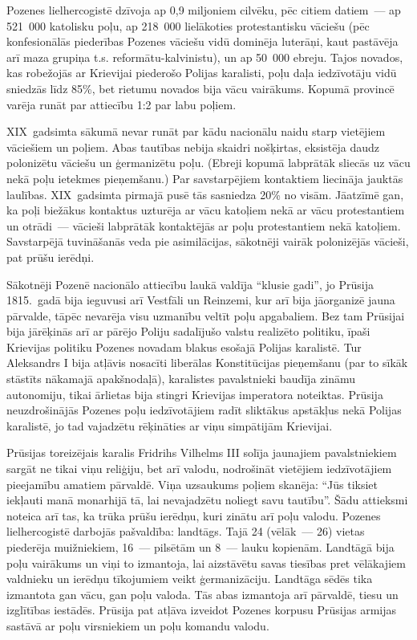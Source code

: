 \documentclass[twoside,a5paper,12pt,fleqn,openany]{extbook}
\begin{document}
Pozenes lielhercogistē dzīvoja ap 0,9 miljoniem cilvēku, pēc citiem datiem~--- ap 521~000 katolisku poļu, ap 218~000 lielākoties protestantisku vāciešu (pēc konfesionālās piederības Pozenes vāciešu vidū dominēja luterāņi, kaut pastāvēja arī maza grupiņa t.s. reformātu-kalvinistu), un ap 50~000 ebreju. Tajos novados, kas robežojās ar Krievijai piederošo Polijas karalisti, poļu daļa iedzīvotāju vidū sniedzās līdz 85\%, bet rietumu novados bija vācu vairākums. Kopumā provincē varēja runāt par attiecību 1:2 par labu poļiem.

XIX~gadsimta sākumā nevar runāt par kādu nacionālu naidu starp vietējiem vāciešiem un poļiem. Abas tautības nebija skaidri nošķirtas, eksistēja daudz polonizētu vāciešu un ģermanizētu poļu. (Ebreji kopumā labprātāk sliecās uz vācu nekā poļu ietekmes pieņemšanu.) Par savstarpējiem kontaktiem liecināja jauktās laulības. XIX~gadsimta pirmajā pusē tās sasniedza 20\% no visām. Jāatzīmē gan, ka poļi biežākus kontaktus uzturēja ar vācu katoļiem nekā ar vācu protestantiem un otrādi~--- vācieši labprātāk kontaktējās ar poļu protestantiem nekā katoļiem. Savstarpējā tuvināšanās veda pie asimilācijas, sākotnēji vairāk polonizējās vācieši, pat prūšu ierēdņi.

Sākotnēji Pozenē nacionālo attiecību laukā valdīja ``klusie gadi'', jo Prūsija 1815.~gadā bija ieguvusi arī Vestfāli un Reinzemi, kur arī bija jāorganizē jauna pārvalde, tāpēc nevarēja visu uzmanību veltīt poļu apgabaliem. Bez tam Prūsijai bija jārēķinās arī ar pārējo Poliju sadalījušo valstu realizēto politiku, īpaši Krievijas politiku Pozenes novadam blakus esošajā Polijas karalistē. Tur Aleksandrs I bija atļāvis nosacīti liberālas Konstitūcijas pieņemšanu (par to sīkāk stāstīts nākamajā apakšnodaļā), karalistes pavalstnieki baudīja zināmu autonomiju, tikai ārlietas bija stingri Krievijas imperatora noteiktas. Prūsija neuzdrošinājās Pozenes poļu iedzīvotājiem radīt sliktākus apstākļus nekā Polijas karalistē, jo tad vajadzētu rēķināties ar viņu simpātijām Krievijai.

Prūsijas toreizējais karalis Fridrihs Vilhelms III solīja jaunajiem pavalstniekiem sargāt ne tikai viņu reliģiju, bet arī valodu, nodrošināt vietējiem iedzīvotājiem pieejamību amatiem pārvaldē. Viņa uzsaukums poļiem skanēja: ``Jūs tiksiet iekļauti manā monarhijā tā, lai nevajadzētu noliegt savu tautību''. Šādu attieksmi noteica arī tas, ka trūka prūšu ierēdņu, kuri zinātu arī poļu valodu. Pozenes lielhercogistē darbojās pašvaldība: landtāgs. Tajā 24 (vēlāk~--- 26) vietas piederēja muižniekiem, 16~--- pilsētām un 8~--- lauku kopienām. Landtāgā bija poļu vairākums un viņi to izmantoja, lai aizstāvētu savas tiesības pret vēlākajiem valdnieku un ierēdņu tīkojumiem veikt ģermanizāciju. Landtāga sēdēs tika izmantota gan vācu, gan poļu valoda. Tās abas izmantoja arī pārvaldē, tiesu un izglītības iestādēs. Prūsija pat atļāva izveidot Pozenes korpusu Prūsijas armijas sastāvā ar poļu virsniekiem un poļu komandu valodu.
\end{document}
